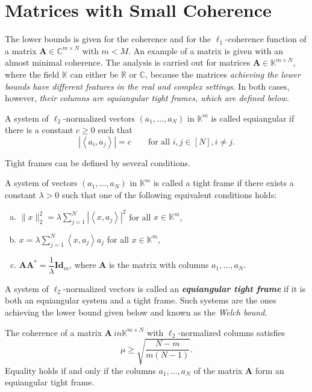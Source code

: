 \section{Matrices with Small Coherence}
The lower bounds is given for the coherence and for the $\ell_1$-coherence function of a matrix $\mathbf{A} \in \mathbb{C}^{m \times N}$ with $m < M$. An example of a matrix is given with an almost minimal coherence. The analysis is carried out for matrices $\mathbf{A} \in \mathbb{K}^{m \times N}$, where the field $\mathbb{K}$ can either be $\mathbb{R}$ or $\mathbb{C}$, because the matrices \emph{\textcolor[rgb]{1,0,0}{achieving the lower bounds have different features in the real and complex settings}}. In both cases, however, \emph{their columns are equiangular \textcolor[rgb]{1,0,0}{tight frames}, which are defined below}.
\begin{definition}
    \label{def1.5}
    A system of $\ell_2$-normalized vectors $(a_1,\dots,a_N)$ in $\mathbb{K}^m$ is called \textcolor[rgb]{1,0,0}{equiangular} if there is a constant $c \geq 0$ such that
    \begin{equation*}
        \left|\left<a_i,a_j\right>\right| = c \qquad \text{for all }i, j \in [N], i \neq j.
    \end{equation*}
\end{definition}

Tight frames can be defined by several conditions.

\begin{definition}
    \label{def1.6}
    A system of vectors $(a_1,\dots,a_N)$ in $\mathbb{K}^m$ is called a \textcolor[rgb]{1,0,0}{tight frame} if there exists a constant $\lambda > 0$ such that one of the following equivalent conditions holds:
    \begin{enumerate} [(a)]
        \item $\|x\|_2^2 = \lambda \sum\limits_{j = 1}^N\left|\left<x, a_j\right>\right|^2$ for all $x\in \mathbb{K}^m$,
        \item $x = \lambda \sum\limits_{j=1}^N\left<x,a_j\right>a_j$ for all $x \in \mathbb{K}^m$,
        \item $\mathbf{AA}^* = \dfrac{1}{\lambda}\mathbf{Id}_m$, where $\mathbf{A}$ is the matrix with columns $a_1,\dots,a_N$.
    \end{enumerate}
\end{definition}

A system of $\ell_2$-normalized vectors is called an \emph{\textbf{\textcolor[rgb]{1,0,0}{equiangular tight frame}}} if it is both an equiangular system and a tight frame. Such systems are the ones achieving the lower bound given below and known as the \emph{\textcolor[rgb]{1,0,0}{Welch bound}}.
\begin{theorem}
    \label{th1.7}
    The coherence of a matrix $\mathbf{A}\ in \mathbb{K}^{m \times N}$ with $\ell_2$-normalized columns satisfies
    \begin{equation}
        \label{eq1.4}
        \mu \geq \sqrt{\dfrac{N-m}{m(N-1)}}.
    \end{equation}
    Equality holds if and only if the columns $a_1,\dots,a_N$ of the matrix $\mathbf{A}$ form an equiangular tight frame.
\end{theorem}


